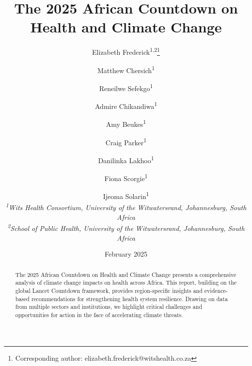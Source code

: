 \title{\Large\textbf{The 2025 African Countdown on Health and Climate Change}}

\author{
Elizabeth Frederick\textsuperscript{1,2}\thanks{Corresponding author: elizabeth.frederick@witshealth.co.za} \and
Matthew Chersich\textsuperscript{1} \and
Reneilwe Sefekgo\textsuperscript{1} \and
Admire Chikandiwa\textsuperscript{1} \and
Amy Beukes\textsuperscript{1} \and
Craig Parker\textsuperscript{1} \and
Danilinka Lakhoo\textsuperscript{1} \and
Fiona Scorgie\textsuperscript{1} \and
Ijeoma Solarin\textsuperscript{1}
\\[2ex]
\small\itshape
\textsuperscript{1}Wits Health Consortium, University of the Witwatersrand, Johannesburg, South Africa\\
\textsuperscript{2}School of Public Health, University of the Witwatersrand, Johannesburg, South Africa
}

\date{February 2025}

\maketitle
\thispagestyle{empty}

\begin{abstract}
The 2025 African Countdown on Health and Climate Change presents a comprehensive analysis of climate change impacts on health across Africa. This report, building on the global Lancet Countdown framework, provides region-specific insights and evidence-based recommendations for strengthening health system resilience. Drawing on data from multiple sectors and institutions, we highlight critical challenges and opportunities for action in the face of accelerating climate threats.
\end{abstract}
